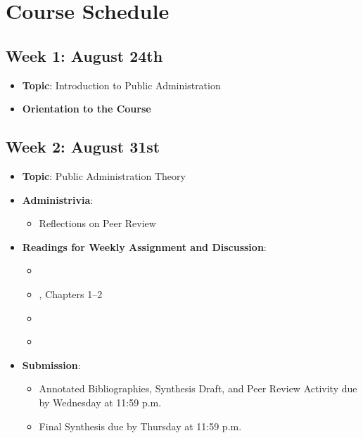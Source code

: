 \documentclass[12pt, letterpaper]{article}
\begin{document}
\section{Course Schedule}

\subsection*{Week 1: August 24th}
    \begin{itemize}
        \item \textbf{Topic}: Introduction to Public Administration
        \item \textbf{Orientation to the Course}
    \end{itemize}

\subsection*{Week 2: August 31st}
    \begin{itemize}
        \item \textbf{Topic}: Public Administration Theory
        \item \textbf{Administrivia}:
            \begin{itemize}
                \item Reflections on Peer Review
            \end{itemize}
        \item \textbf{Readings for Weekly Assignment and Discussion}:
            \begin{itemize}
                \item \cite{Weber1946}
                \item \cite{Denhardt2015}, Chapters 1--2
                \item \cite{Rosenbloom2008}
                \item \cite{Wilson1887}
            \end{itemize}
        \item \textbf{Submission}: 
                \begin{itemize}
                    \item Annotated Bibliographies, Synthesis Draft, and Peer Review Activity due by Wednesday at 11:59 p.m. 
                    \item Final Synthesis due by Thursday at 11:59 p.m.
                \end{itemize}
    \end{itemize}
\end{document}

